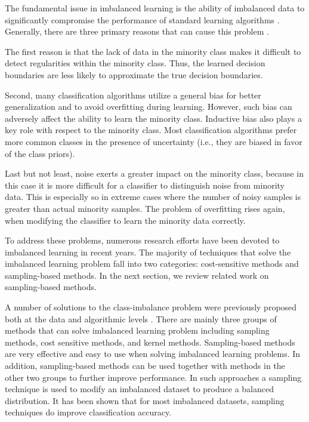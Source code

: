 \documentclass{iitthesis}
\begin{document}
The fundamental issue in imbalanced learning is the ability of imbalanced data to significantly compromise the performance of standard learning algorithms \cite{HH:09}. Generally, there are three primary reasons that can cause this problem \cite{weiss2004mining}. 

The first reason is that the lack of data in the minority class makes it difficult to detect regularities within the minority class. Thus, the learned decision boundaries are less likely to approximate the true decision boundaries. 

Second, many classification algorithms utilize a general bias for better generalization and to avoid overfitting during learning. However, such bias can adversely affect the ability to learn the minority class. Inductive bias also plays a key role with respect to the minority class. Most classification algorithms prefer more common classes in the presence of uncertainty (i.e., they are biased in favor of the class priors). 

Last but not least, noise exerts a greater impact on the minority class, because in this case it is more difficult for a classifier to distinguish noise from minority data. This is especially so in extreme cases where the number of noisy samples is greater than actual minority samples. The problem of overfitting rises again, when modifying the classifier to learn the minority data correctly.

To address these problems, numerous research efforts have been devoted to imbalanced learning in recent years. The majority of techniques that solve the imbalanced learning problem fall into two categories: cost-sensitive methods and sampling-based methods. In the next section, we review related work on sampling-based methods.

A number of solutions to the class-imbalance problem were previously proposed both at the data and algorithmic levels \cite{chawla2004editorial}. There are mainly three groups of methods that can solve imbalanced learning problem \cite{HH:09} including sampling methods, cost sensitive methods, and kernel methods. Sampling-based methods are very effective and easy to use when solving imbalanced learning problems. In addition, sampling-based methods can be used together with methods in the other two groups to further improve performance. In such approaches a sampling technique is used to modify an imbalanced dataset to produce a balanced distribution. It has been shown that for most imbalanced datasets, sampling techniques do improve classification accuracy.
\end{document}
